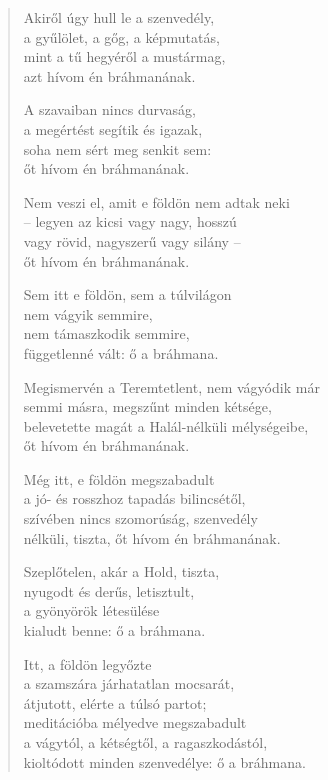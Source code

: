 \begin{verse}
 Akiről úgy hull le a szenvedély,\\
a gyűlölet, a gőg, a képmutatás,\\
mint a tű hegyéről a mustármag,\\
azt hívom én bráhmanának.

 A szavaiban nincs durvaság,\\
a megértést segítik és igazak,\\
soha nem sért meg senkit sem:\\
őt hívom én bráhmanának.

 Nem veszi el, amit e földön nem adtak neki\\
– legyen az kicsi vagy nagy, hosszú\\
vagy rövid, nagyszerű vagy silány –\\
őt hívom én bráhmanának.

\vspace*{-0.2\baselineskip}
 Sem itt e földön, sem a túlvilágon\\
nem vágyik semmire,\\
nem támaszkodik semmire,\\
függetlenné vált: ő a bráhmana.

\vspace*{-0.2\baselineskip}
 Megismervén a Teremtetlent, nem vágyódik már\\
semmi másra, megszűnt minden kétsége,\\
belevetette magát a Halál-nélküli mélységeibe,\\
őt hívom én bráhmanának.

\vspace*{-0.2\baselineskip}
 Még itt, e földön megszabadult\\
a jó- és rosszhoz tapadás bilincsétől,\\
szívében nincs szomorúság, szenvedély\\
nélküli, tiszta, őt hívom én bráhmanának.

\vspace*{-0.2\baselineskip}
 Szeplőtelen, akár a Hold, tiszta,\\
nyugodt és derűs, letisztult,\\
a gyönyörök létesülése\\
kialudt benne: ő a bráhmana.

\vspace*{-0.2\baselineskip}
 Itt, a földön legyőzte\\
a szamszára járhatatlan mocsarát,\\
átjutott, elérte a túlsó partot;\\
meditációba mélyedve megszabadult\\
a vágytól, a kétségtől, a ragaszkodástól,\\
kioltódott minden szenvedélye: ő a bráhmana.


\end{verse}
